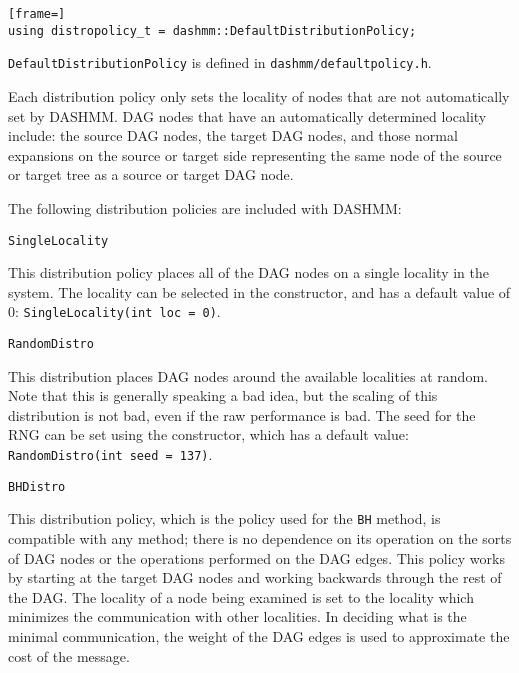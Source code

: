 \begin{lstlisting}[frame=]
using distropolicy_t = dashmm::DefaultDistributionPolicy;
\end{lstlisting}

\noindent \texttt{DefaultDistributionPolicy} is defined in
\texttt{dashmm/defaultpolicy.h}.

Each distribution policy only sets the locality of nodes that are not
automatically set by DASHMM. DAG nodes that have an automatically determined
locality include: the source DAG nodes, the target DAG nodes, and those
normal expansions on the source or target side representing the same node of
the source or target tree as a source or target DAG node.

The following distribution policies are included with DASHMM:

\begin{lstlisting}
SingleLocality
\end{lstlisting}

\noindent This distribution policy places all of the DAG nodes on a single
locality in the system. The locality can be selected in the constructor, and
has a default value of 0: \texttt{SingleLocality(int loc = 0)}.

\begin{lstlisting}
RandomDistro
\end{lstlisting}

\noindent This distribution places DAG nodes around the available localities at
random. Note that this is generally speaking a bad idea, but the scaling of
this distribution is not bad, even if the raw performance is bad. The seed for
the RNG can be set using the constructor, which has a default value:
\texttt{RandomDistro(int seed = 137)}.

\begin{lstlisting}
BHDistro
\end{lstlisting}

\noindent This distribution policy, which is the policy used for the
\texttt{BH} method, is compatible with any method; there is no dependence on
its operation on the sorts of DAG nodes or the operations performed on the DAG
edges. This policy works by starting at the target DAG nodes and working
backwards through the rest of the DAG. The locality of a node being examined is
set to the locality which minimizes the communication with other localities.
In deciding what is the minimal communication, the weight of the DAG edges is
used to approximate the cost of the message.

